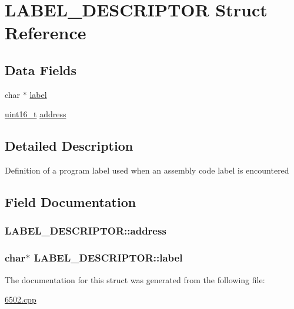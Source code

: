 \hypertarget{struct_l_a_b_e_l___d_e_s_c_r_i_p_t_o_r}{\section{L\-A\-B\-E\-L\-\_\-\-D\-E\-S\-C\-R\-I\-P\-T\-O\-R Struct Reference}
\label{struct_l_a_b_e_l___d_e_s_c_r_i_p_t_o_r}
}
\subsection*{Data Fields}
\begin{DoxyCompactItemize}
\item 
char $\ast$ \hyperlink{struct_l_a_b_e_l___d_e_s_c_r_i_p_t_o_r_aa787e6514bf268475466428a463e0e12}{label}
\item 
\hyperlink{6502_8cpp_a273cf69d639a59973b6019625df33e30}{uint16\-\_\-t} \hyperlink{struct_l_a_b_e_l___d_e_s_c_r_i_p_t_o_r_a4aac8a755ffea80be2dceac93c187252}{address}
\end{DoxyCompactItemize}


\subsection{Detailed Description}
Definition of a program label used when an assembly code label is encountered 

\subsection{Field Documentation}
\hypertarget{struct_l_a_b_e_l___d_e_s_c_r_i_p_t_o_r_a4aac8a755ffea80be2dceac93c187252}{
\subsubsection[{address}]{ {\bf L\-A\-B\-E\-L\-\_\-\-D\-E\-S\-C\-R\-I\-P\-T\-O\-R\-::address}}}\label{struct_l_a_b_e_l___d_e_s_c_r_i_p_t_o_r_a4aac8a755ffea80be2dceac93c187252}
\hypertarget{struct_l_a_b_e_l___d_e_s_c_r_i_p_t_o_r_aa787e6514bf268475466428a463e0e12}{
\subsubsection[{label}]{\setlength{\rightskip}{0pt plus 5cm}char$\ast$ {\bf L\-A\-B\-E\-L\-\_\-\-D\-E\-S\-C\-R\-I\-P\-T\-O\-R\-::label}}}\label{struct_l_a_b_e_l___d_e_s_c_r_i_p_t_o_r_aa787e6514bf268475466428a463e0e12}


The documentation for this struct was generated from the following file\-:\begin{DoxyCompactItemize}
\item 
\hyperlink{6502_8cpp}{6502.\-cpp}\end{DoxyCompactItemize}
